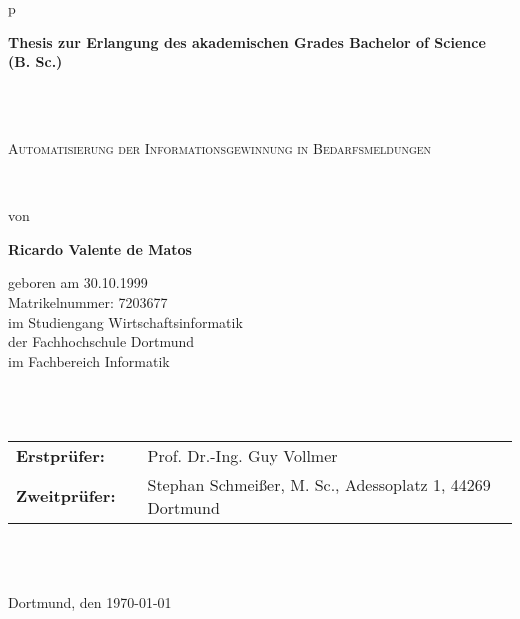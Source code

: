 \begin{center}
	\begin{tabular}{p{\textwidth}}
		
		\begin{center}
			\textbf{\Large{Thesis zur Erlangung des akademischen Grades Bachelor of Science (B. Sc.)}}
		\end{center} \\ \\
		
		\begin{center}
			\LARGE{\textsc{
					Automatisierung der Informationsgewinnung in Bedarfsmeldungen
			}}
		\end{center}
		
		\\
		
		
		
		\begin{center}
			von
		\end{center}
		
		\begin{center}
			\large{\textbf{Ricardo Valente de Matos}}
		\end{center}
	
	\begin{center}
		\large{geboren am 30.10.1999} \\
		\large{Matrikelnummer: 7203677} \\
		\large{im Studiengang Wirtschaftsinformatik \\
			der Fachhochschule Dortmund \\ im Fachbereich Informatik}
	\end{center}
		
		
		\\
		
		\\
		
		\begin{center}
			\begin{tabular}{lll}
				\textbf{Erstprüfer:} & & Prof. Dr.-Ing. Guy Vollmer\\
				\textbf{Zweitprüfer:} & & Stephan Schmeißer, M. Sc., Adessoplatz 1, 44269 Dortmund\\
			\end{tabular}
		\end{center}
	
	\\ \\
	
	\begin{center}
		\large{Dortmund, den \today}
	\end{center}
		
	\end{tabular}
\end{center}